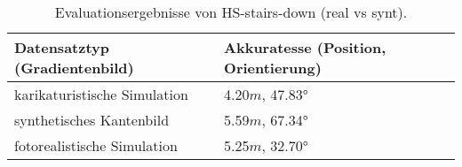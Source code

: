 \begin{table}
	\centering
	\caption{Evaluationsergebnisse von HS-stairs-down (real vs synt).}
	\begin{tabularx}{0.75\textwidth}{X X}\textbf{Datensatztyp} \hspace{2cm} (Gradientenbild)& \textbf{Akkuratesse} \hspace{2cm} (Position, Orientierung)\\
		\hline
		karikaturistische Simulation & 4.20$m$, 47.83°\\
		\hline
		synthetisches Kantenbild & 5.59$m$, 67.34°\\
		\hline
		fotorealistische Simulation & 5.25$m$, 32.70°\\
	\end{tabularx}
	\label{tab:synth_hs_stairs_down}
\end{table}
